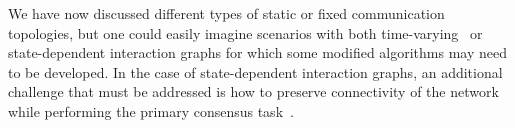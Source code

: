 \documentclass{autart}
\newcommand{\realnonnegative}{\mathbb{R}_{\ge 0}}
\newcommand{\NN}{{\mathcal{N}}}
\begin{document}
We have now discussed different types of static or fixed communication topologies,
but one could easily imagine scenarios with both
time-varying~\citep{WZ-HL-ZJ:16} or state-dependent interaction graphs
for which some modified algorithms may need to be developed. In the case
of state-dependent interaction graphs, an additional challenge that
must be addressed is how to preserve connectivity of the network while
performing the primary consensus task~\citep{HY-PJA:12,YF-GH:15,XY-JW-DVD-KHJ:17,PY-LD-ZL-ZG:16}.

\end{document}

